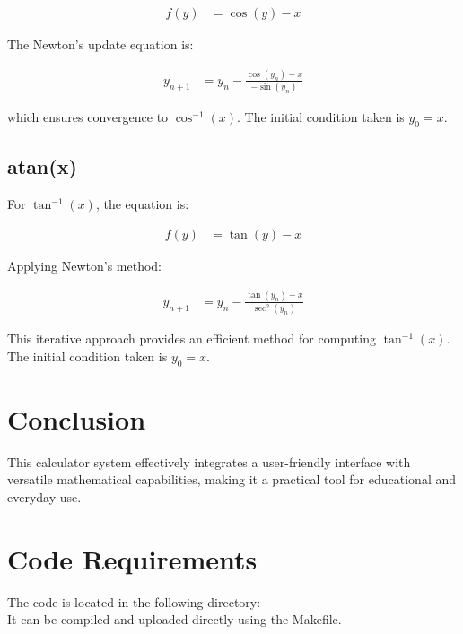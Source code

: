\documentclass[journal]{IEEEtran}
\begin{document}
\begin{align}
	f(y) &= \cos(y) - x
\end{align}

The Newton’s update equation is:

\begin{align}
	y_{n+1} &= y_n - \frac{\cos(y_n) - x}{-\sin(y_n)}
\end{align}

which ensures convergence to \(\cos^{-1}(x)\). The initial condition taken is $y_0 =x$.

\subsection{atan(x)}
For \(\tan^{-1}(x)\), the equation is:

\begin{align}
	f(y) &= \tan(y) - x
\end{align}

Applying Newton’s method:

\begin{align}
	y_{n+1} &= y_n - \frac{\tan(y_n) - x}{\sec^2(y_n)}
\end{align}

This iterative approach provides an efficient method for computing \(\tan^{-1}(x)\). The initial condition taken is $y_0 =x$.


	\section{Conclusion}
	This calculator system effectively integrates a user-friendly interface with versatile mathematical capabilities, making it a practical tool for educational and everyday use.
	
	\section{Code Requirements}
	The code is located in the following directory:\\  
	 It can be compiled and uploaded directly using the Makefile.
	
\end{document}
